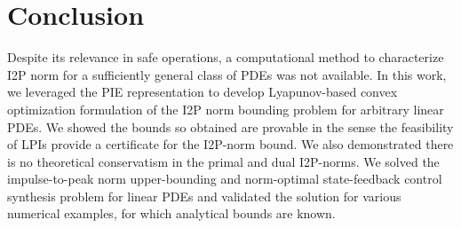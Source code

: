 \documentclass[letterpaper, 10 pt, conference]{ieeeconf}
\theoremstyle{definition}
\begin{document}
\section{Conclusion}
Despite its relevance in safe operations, a computational method to characterize I2P norm for a sufficiently general class of PDEs was not available. In this work, we leveraged the PIE representation to develop Lyapunov-based convex optimization formulation of the I2P norm bounding problem for arbitrary linear PDEs. We showed the bounds so obtained are provable in the sense the feasibility of LPIs provide a certificate for the I2P-norm bound. We also demonstrated there is no theoretical conservatism in the primal and dual I2P-norms. We solved the impulse-to-peak norm upper-bounding and norm-optimal state-feedback control synthesis problem for linear PDEs and validated the solution for various numerical examples, for which analytical bounds are known.






\end{document}
